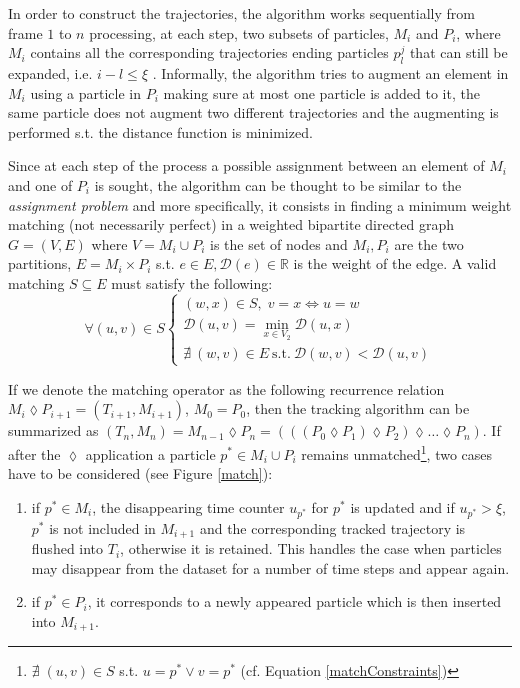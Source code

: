 In order to construct the trajectories, the algorithm works sequentially from frame $1$ to $n$ processing, at each step, two subsets of particles, $M_i$ and $P_{i}$, where $M_i$ contains all the corresponding trajectories ending particles $p^{j}_l$ that can still be expanded, i.e. $i-l \leq \xi$ .
Informally, the algorithm tries to augment an element in $M_i$ using a particle in $P_i$ making sure at most one particle is added to it, the same particle does not augment two different trajectories and the augmenting is performed s.t. the distance function is minimized.

Since at each step of the process a possible assignment between an element of $M_i$ and one of $P_i$ is sought, the algorithm can be thought to be similar to the \textit{assignment problem} \cite{bellmann1978} and more specifically, it consists in finding a minimum weight matching (not necessarily perfect) in  a weighted bipartite directed graph $G=(V,E)$ where $V={M_i} \cup P_i$ is the set of nodes and ${M_i}, P_i$ are the two partitions, $E = {M_i} \times P_i$ s.t. $e \in E, \mathcal{D}(e) \in \mathbb{R}$ is the weight of the edge.
A valid matching $S \subseteq E$ must satisfy the following: 
\begin{equation}
\forall (u,v) \in S 
\left\{
  \begin{array}{lr}
   (w,x) \in S,\; v=x\Longleftrightarrow u=w\\
   \mathcal{D}(u,v) = \min_{x \in V_2} \mathcal{D}(u,x)  \\
    \nexists \: (w,v) \in E \: \mbox{s.t.} \: \mathcal{D}(w,v) < \mathcal{D}(u,v)
  \end{array}
\right.
\label{matchConstraints}
\end{equation}

If we denote the matching operator  as the following recurrence relation $  M_i \lozenge P_{i+1} = (T_{i+1},M_{i+1}) $, $M_0=P_0$, then the  tracking algorithm can be summarized as $(T_n,M_n) = M_{n-1} \lozenge P_{n}=(((P_0 \lozenge P_1)\lozenge P_2) \lozenge \ldots \lozenge P_n)$.
If after the $\lozenge$ application a particle $p^* \in {M_i} \cup P_i $ remains  unmatched\footnote{$\nexists \;(u,v) \in S $ s.t. $  u=p^* \vee v=p^*$ (cf. Equation \ref{matchConstraints})}, two cases have to be considered (see Figure \ref{match}):
\begin{enumerate}
 \item if $p^* \in M_{i}$, the disappearing time counter $u_{p^*}$ for $p^*$ is updated and if $u_{p^*} > \xi$, $p^*$ is not included in $M_{i+1}$ and the corresponding tracked trajectory is flushed into $T_i$, otherwise it is retained. This handles the case when particles may disappear from the dataset for a number of time steps and appear again. 
 \item if $p^* \in P_i$, it corresponds to a newly appeared particle which is then inserted into $M_{i+1}$. 
\end{enumerate}
 
